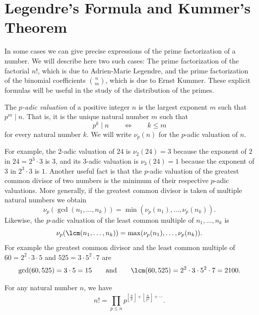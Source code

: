 \section{Legendre's Formula and Kummer's Theorem}

In some cases we can give precise expressions of the prime factorization of a number. We will describe here two such cases: The prime factorization of the factorial $n!$, which is due to Adrien-Marie Legendre, and the prime factorization of the binomial coefficients $\binom{n}{m}$, which is due to Ernst Kummer. These explicit formulas will be useful in the study of the distribution of the primes.

\begin{definition}
  The \emph{$p$-adic valuation} of a positive integer $n$ is the largest exponent $m$ such that $p^m\mid n$. That is, it is the unique natural number $m$ such that
  \begin{equation*}
    p^k\mid n\qquad\Leftrightarrow\qquad k\leq m
  \end{equation*}
  for every natural number $k$. We will write $\nu_p(n)$ for the $p$-adic valuation of $n$.
\end{definition}

For example, the $2$-adic valuation of $24$ is $\nu_2(24)=3$ because the exponent of $2$ in $24=2^3\cdot 3$ is $3$, and its $3$-adic valuation is $\nu_3(24)=1$ because the exponent of $3$ in $2^3\cdot 3$ is $1$. Another useful fact is that the $p$-adic valuation of the greatest common divisor of two numbers is the minimum of their respective $p$-adic valuations. More generally, if the greatest common divisor is taken of multiple natural numbers we obtain
\begin{equation*}
  \nu_p(\gcd(n_1,\ldots,n_k))=\min(\nu_p(n_1),\ldots,\nu_p(n_k)).
\end{equation*}
Likewise, the $p$-adic valuation of the least common multiple of $n_1,\ldots,n_k$ is
\begin{equation*}
  \nu_p(\lcm(n_1,\ldots,n_k))=\max(\nu_p(n_1),\ldots,\nu_p(n_k)).
\end{equation*}
For example the greatest common divisor and the least common multiple of $60=2^2\cdot 3\cdot 5$ and $525=3\cdot 5^2\cdot 7$ are
\begin{equation*}
  \gcd(60,525)=3\cdot 5=15\qquad\text{and}\qquad\lcm(60,525)=2^2\cdot 3\cdot 5^2\cdot 7=2100.
\end{equation*}

\begin{theorem}\label{theorem:legendres-formula}
  For any natural number $n$, we have
  \begin{equation*}
    n!=\prod_{p\leq n}p^{\left\lfloor\frac{n}{p}\right\rfloor + \left\lfloor\frac{n}{p^2}\right\rfloor + \cdots}.
  \end{equation*}
\end{theorem}

